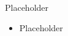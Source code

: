 \documentclass[12pt]{beamer}
\begin{document}
\begin{frame}{Placeholder}
  \begin{itemize}
    \item Placeholder
  \end{itemize}
\end{frame}
\end{document}
